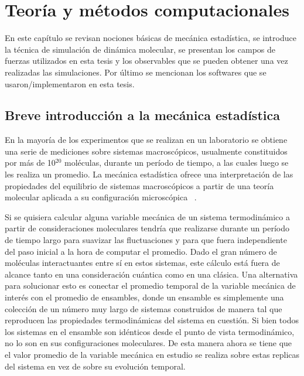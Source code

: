 \chapter[Teoría y métodos computacionales]{Teoría y métodos computacionales}
\thispagestyle{empty}

\vspace{50pt}

\begin{adjustwidth}{50pt}{50pt}
    En este capítulo se revisan nociones básicas de mecánica estadística, se 
    introduce la técnica de simulación de dinámica molecular, se presentan los 
    campos de fuerzas utilizados en esta tesis y los observables que se pueden 
    obtener una vez realizadas las simulaciones. Por último se mencionan los 
    softwares que se usaron/implementaron en esta tesis.
\end{adjustwidth}

\clearpage
\newpage
\thispagestyle{empty}
\mbox{}
\newpage


\section{Breve introducción a la mecánica estadística}

En la mayoría de los experimentos que se realizan en un laboratorio se obtiene 
una serie de mediciones sobre sistemas macroscópicos, usualmente constituidos por 
más de 10$^{20}$ moléculas, durante un período de tiempo, a las cuales luego se 
les realiza un promedio. La mecánica estadística ofrece una interpretación de 
las propiedades del equilibrio de sistemas macroscópicos a partir de una teoría 
molecular aplicada a su configuración microscópica ~\cite{hill1986}.

Si se quisiera calcular alguna variable mecánica de un sistema termodinámico a
partir de consideraciones moleculares tendría que realizarse durante un período
de tiempo largo para suavizar las fluctuaciones y para que fuera independiente
del paso inicial a la hora de computar el promedio. Dado el gran número de 
moléculas interactuantes entre sí en estos sistemas, este cálculo está fuera de
alcance tanto en una consideración cuántica como en una clásica. Una alternativa
para solucionar esto es conectar el promedio temporal de la variable mecánica de
interés con el promedio de ensambles, donde un ensamble es simplemente una 
colección de un número muy largo de sistemas construidos de manera tal que 
reproducen las propiedades termodinámicas del sistema en cuestión. Si bien todos
los sistemas en el ensamble son idénticos desde el punto de vista termodinámico,
no lo son en sus configuraciones moleculares. De esta manera ahora se tiene
que el valor promedio de la variable mecánica en estudio se realiza sobre estas 
replicas del sistema en vez de sobre su evolución temporal.

